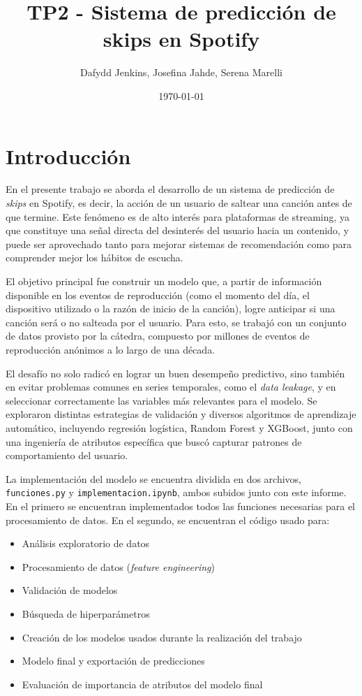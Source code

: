 \documentclass{article}
\title{TP2 - Sistema de predicción de skips en Spotify}
\author{Dafydd Jenkins, Josefina Jahde, Serena Marelli}
\date{\today}
\begin{document}
\maketitle

\section*{Introducción}

En el presente trabajo se aborda el desarrollo de un sistema de predicción de \textit{skips} en Spotify, es decir, la acción de un usuario de saltear una canción antes de que termine. Este fenómeno es de alto interés para plataformas de streaming, ya que constituye una señal directa del desinterés del usuario hacia un contenido, y puede ser aprovechado tanto para mejorar sistemas de recomendación como para comprender mejor los hábitos de escucha.

El objetivo principal fue construir un modelo que, a partir de información disponible en los eventos de reproducción (como el momento del día, el dispositivo utilizado o la razón de inicio de la canción), logre anticipar si una canción será o no salteada por el usuario. Para esto, se trabajó con un conjunto de datos provisto por la cátedra, compuesto por millones de eventos de reproducción anónimos a lo largo de una década.

El desafío no solo radicó en lograr un buen desempeño predictivo, sino también en evitar problemas comunes en series temporales, como el \textit{data leakage}, y en seleccionar correctamente las variables más relevantes para el modelo. Se exploraron distintas estrategias de validación y diversos algoritmos de aprendizaje automático, incluyendo regresión logística, Random Forest y XGBoost, junto con una ingeniería de atributos específica que buscó capturar patrones de comportamiento del usuario.

La implementación del modelo se encuentra dividida en dos archivos, \texttt{funciones.py} y \texttt{implementacion.ipynb}, ambos subidos junto con este informe. En el primero se encuentran implementados todos las funciones necesarias para el procesamiento de datos. En el segundo, se encuentran el código usado para:

\begin{itemize}
	\item Análisis exploratorio de datos
	\item Procesamiento de datos (\textit{feature engineering})
	\item Validación de modelos
	\item Búsqueda de hiperparámetros
	\item Creación de los modelos usados durante la realización del trabajo
	\item Modelo final y exportación de predicciones
	\item Evaluación de importancia de atributos del modelo final
\end{itemize}
\end{document}
